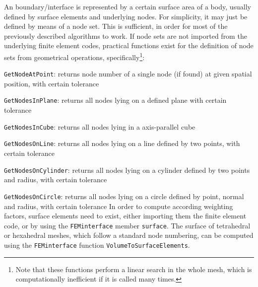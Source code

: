 An boundary/interface is represented by a certain surface area of a body, usually defined by surface elements and underlying nodes.
For simplicity, it may just be defined by means of a node set.
This is sufficient, in order for most of the previously described algorithms to work.
If node sets are not imported from the underlying finite element codes, practical functions exist for the definition of
node sets from geometrical operations, specifically\footnote{Note that these functions perform a linear search in the whole mesh, which is computationally inefficient if it is called many times.}:
\bi
  \item \texttt{GetNodeAtPoint}: returns node number of a single node (if found) at given spatial position, with certain tolerance
  \item \texttt{GetNodesInPlane}: returns all nodes lying on a defined plane with certain tolerance
  \item \texttt{GetNodesInCube}: returns all nodes lying in a axis-parallel cube
  \item \texttt{GetNodesOnLine}: returns all nodes lying on a line defined by two points, with certain tolerance
  \item \texttt{GetNodesOnCylinder}: returns all nodes lying on a cylinder defined by two points and radius, with certain tolerance
  \item \texttt{GetNodesOnCircle}: returns all nodes lying on a circle defined by point, normal and radius, with certain tolerance
\ei
In order to compute according weighting factors, surface elements need to exist, either importing them the finite element code, or by using the \texttt{FEMinterface} member \texttt{surface}.
The surface of tetrahedral or hexahedral meshes, which follow a standard node numbering, can be computed using
the \texttt{FEMinterface} function \texttt{VolumeToSurfaceElements}.


